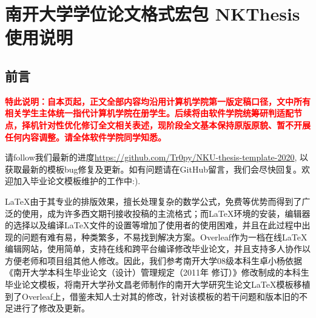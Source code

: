 
\chapter{南开大学学位论文格式宏包 NKThesis 使用说明} \label{chpt:A}

\section{前言}

{\bf \textcolor{red}{特此说明：自本页起，正文全部内容均沿用计算机学院第一版定稿口径，文中所有相关学生主体统一指代计算机学院在册学生。后续将由软件学院统筹研判适配节点，择机针对性优化修订全文相关表述，现阶段全文基本保持原版原貌、暂不开展任何内容调整。请全体软件学院同学知悉。}}

请follow我们最新的进度\href{https://github.com/Tr0py/NKU-thesis-template-2020}{https://github.com/Tr0py/NKU-thesis-template-2020}, 以获取最新的模板bug修复及更新。如有问题请在GitHub留言，我们会尽快回复。欢迎加入毕业论文模板维护的工作中:).

\LaTeX 由于其专业的排版效果，擅长处理复杂的数学公式，免费等优势而得到了广泛的使用，成为许多西文期刊接收投稿的主流格式；而\LaTeX 环境的安装，编辑器的选择以及编译\LaTeX 文件的设置等增加了使用者的使用困难，并且在此过程中出现的问题有难有易，种类繁多，不易找到解决方案。Overleaf作为一档在线\LaTeX 编辑网站，使用简单，支持在线和跨平台编译修改毕业论文，并且支持多人协作以方便老师和项目组其他人修改。因此，我们参考南开大学08级本科生卓小杨依据《南开大学本科生毕业论文（设计）管理规定（2011年 修订）》修改制成的本科生毕业论文模板，将南开大学孙文昌老师制作的南开大学研究生论文\LaTeX 模板移植到了Overleaf上，借鉴未知人士对其的修改，针对该模板的若干问题和版本旧的不足进行了修改及更新。

